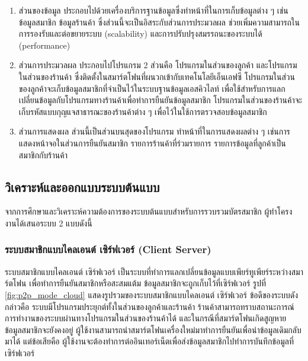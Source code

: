 \documentclass[12pt,a4paper,twocolumn]{article}
\begin{document}
\begin{enumerate} 
\item ส่วนของข้อมูล ประกอบไปด้วยเครื่องบริการฐานข้อมูลซึ่งทำหน้าที่ในการเก็บข้อมูลต่าง ๆ เช่น ข้อมูลสมาชิก ข้อมูลร้านค้า ซึ่งส่วนนี้จะเป็นอิสระกับส่วนการประมวลผล ช่วยเพิ่มความสามารถในการรองรับและต่อขยายระบบ (scalability) และการปรับปรุงสมรรถนะของระบบได้ (performance)

\item ส่วนการประมวลผล ประกอบไปโปรแกรม 2 ส่วนคือ โปรแกรมในส่วนของลูกค้า และโปรแกรมในส่วนของร้านค้า ซึ่งติดตั้งในสมาร์ตโฟนที่ผนวกเข้ากับเทคโนโลยีเอ็นเอฟซี โปรแกรมในส่วนของลูกค้าจะเก็บข้อมูลสมาชิกที่จำเป็นไว้ในระบบฐานข้อมูลเอสคิวไลท์ เพื่อใช้สำหรับการแลกเปลี่ยนข้อมูลกับโปรแกรมทางร้านค้าเพื่อทำการยืนยันข้อมูลสมาชิก โปรแกรมในส่วนของร้านค้าจะเก็บรหัสแบบกุญแจสาธารณะของร้านค้าต่าง ๆ เพื่อไว้ในใช้การตรวจสอบข้อมูลสมาชิก

\item ส่วนการแสดงผล ส่วนนี้เป็นส่วนบนสุดของโปรแกรม ทำหน้าที่ในการแสดงผลต่าง ๆ เช่นการแสดงหน้าจอในส่วนการยืนยันสมาชิก รายการร้านค้าที่ร่วมรายการ รายการข้อมูลที่ลูกค้าเป็นสมาชิกกับร้านค้า
\end{enumerate}

\subsection{วิเคราะห์และออกแบบระบบต้นแบบ}

จากการศึกษาและวิเคราะห์ความต้องการของระบบต้นแบบสำหรับการรวบรวมบัตรสมาชิก ผู้ทำโครงงานได้เสนอระบบ 2 แบบดังนี้

\subsubsection{ระบบสมาชิกแบบไคลเอนต์ เซิร์ฟเวอร์ (Client Server)}
ระบบสมาชิกแบบไคลเอนต์ เซิร์ฟเวอร์ เป็นระบบที่ทำการแลกเปลี่ยนข้อมูลแบบเพียร์ทูเพียร์ระหว่างสมาร์ตโฟน เพื่อทำการยืนยันสมาชิกหรือสะสมแต้ม ข้อมูลสมาชิกจะถูกเก็บไว้ที่เซิร์ฟเวอร์ รูปที่ \ref{fig:p2p_mode_cloud} แสดงรูปรวมของระบบสมาชิกแบบไคลเอนต์ เซิร์ฟเวอร์ ข้อดีของระบบดังกล่าวคือ ระบบมีโปรแกรมประยุกต์ทั้งในส่วนของลูกค้าและร้านค้า ร้านค้าสามารถทราบสถานะการณ์การทำงานของระบบผ่านทางโปรแกรมในส่วนของร้านค้าได้ และในกรณีที่สมาร์ตโฟนเกิดสูญหาย ข้อมูลสมาชิกจะยังคงอยู่ ผู้ใช้งานสามารถนำสมาร์ตโฟนเครื่องใหม่มาทำการยืนยันเพื่อนำข้อมูลเดิมกลับมาได้ แต่ข้อเสียคือ ผู้ใช้งานจะต้องทำการต่ออินเทอร์เน็ตเพื่อส่งข้อมูลสมาชิกไปทำการบันทึกข้อมูลที่เซิร์ฟเวอร์

\end{document}
